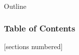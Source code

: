 \maketitle

\begin{frame}{Outline} 
	\frametitle{Table of Contents} 
	[sections numbered]
	\tableofcontents[hidesubsections]
\end{frame}


